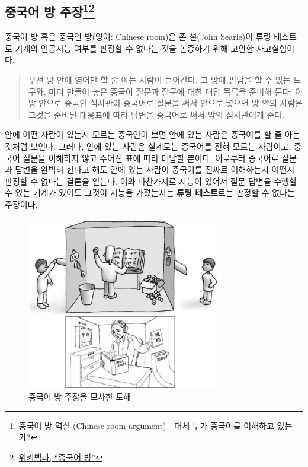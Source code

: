 \documentclass[smallextended]{svjour3}       %
\begin{document}
\hypertarget{chinese-room}{%
\subsection[중국어 방 주장]{\texorpdfstring{중국어 방
주장\footnote{\href{http://ko.experiments.wikidok.net/wp-d/592f718da44f1a4153e80611/View}{중국어
  방 역설 (Chinese room argument) - 대체 누가 중국어를 이해하고 있는가?}}\footnote{\href{https://ko.wikipedia.org/wiki/\%EC\%A4\%91\%EA\%B5\%AD\%EC\%96\%B4_\%EB\%B0\%A9}{위키백과,
  ``중국어 방''}}}{중국어 방 주장}}\label{chinese-room}}

중국어 방 혹은 중국인 방(영어: Chinese room)은 존 설(John Searle)이 튜링
테스트로 기계의 인공지능 여부를 판정할 수 없다는 것을 논증하기 위해
고안한 사고실험이다.

\begin{quote}
우선 방 안에 영어만 할 줄 아는 사람이 들어간다. 그 방에 필담을 할 수
있는 도구와, 미리 만들어 놓은 중국어 질문과 질문에 대한 대답 목록을
준비해 둔다. 이 방 안으로 중국인 심사관이 중국어로 질문을 써서 안으로
넣으면 방 안의 사람은 그것을 준비된 대응표에 따라 답변을 중국어로 써서
밖의 심사관에게 준다.
\end{quote}

안에 어떤 사람이 있는지 모르는 중국인이 보면 안에 있는 사람은 중국어를
할 줄 아는 것처럼 보인다. 그러나, 안에 있는 사람은 실제로는 중국어를
전혀 모르는 사람이고, 중국어 질문을 이해하지 않고 주어진 표에 따라
대답할 뿐이다. 이로부터 중국어로 질문과 답변을 완벽히 한다고 해도 안에
있는 사람이 중국어를 진짜로 이해하는지 어떤지 판정할 수 없다는 결론을
얻는다. 이와 마찬가지로 지능이 있어서 질문 답변을 수행할 수 있는 기계가
있어도 그것이 지능을 가졌는지는 \textbf{튜링 테스트}로는 판정할 수
없다는 주장이다.

\begin{figure}
\hypertarget{id}{%
\centering
\includegraphics[width=0.77\textwidth,height=\textheight]{fig/chinese-room-argument.jpg}
\caption{중국어 방 주장을 모사한 도해}\label{id}
}
\end{figure}
\end{document}
